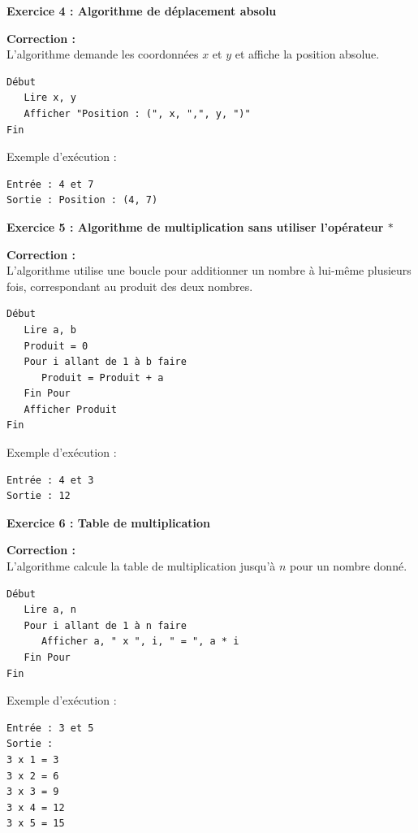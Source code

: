 \documentclass{article}
\begin{document}
\begin{tcolorbox}[colback=green!10!white, colframe=green!75!black, title=\textcolor{white}{  Corrections}]

\textbf{Exercice 4 : Algorithme de déplacement absolu}

\textbf{Correction :} \\
L'algorithme demande les coordonnées \( x \) et \( y \) et affiche la position absolue.

\begin{verbatim}
Début
   Lire x, y
   Afficher "Position : (", x, ",", y, ")"
Fin
\end{verbatim}

Exemple d'exécution :
\begin{verbatim}
Entrée : 4 et 7
Sortie : Position : (4, 7)
\end{verbatim}

\vspace{0.5cm}

\textbf{Exercice 5 : Algorithme de multiplication sans utiliser l'opérateur \(*\)}

\textbf{Correction :} \\
L'algorithme utilise une boucle pour additionner un nombre à lui-même plusieurs fois, correspondant au produit des deux nombres.

\begin{verbatim}
Début
   Lire a, b
   Produit = 0
   Pour i allant de 1 à b faire
      Produit = Produit + a
   Fin Pour
   Afficher Produit
Fin
\end{verbatim}

Exemple d'exécution :
\begin{verbatim}
Entrée : 4 et 3
Sortie : 12
\end{verbatim}

\vspace{0.5cm}

\textbf{Exercice 6 : Table de multiplication}

\textbf{Correction :} \\
L'algorithme calcule la table de multiplication jusqu'à \( n \) pour un nombre donné.

\begin{verbatim}
Début
   Lire a, n
   Pour i allant de 1 à n faire
      Afficher a, " x ", i, " = ", a * i
   Fin Pour
Fin
\end{verbatim}

Exemple d'exécution :
\begin{verbatim}
Entrée : 3 et 5
Sortie :
3 x 1 = 3
3 x 2 = 6
3 x 3 = 9
3 x 4 = 12
3 x 5 = 15
\end{verbatim}

\end{tcolorbox}
\end{document}
